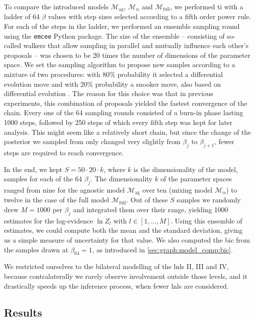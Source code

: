 \documentclass[\relativeRoot/main.tex]{subfiles}
\begin{document}
To compare the introduced models $\mathcal{M}_\text{ag}$, $\mathcal{M}_\alpha$ and $\mathcal{M}_\text{full}$, we performed \gls{ti} with a ladder of 64 $\beta$ values with step sizes selected according to a fifth order power rule. For each of the steps in the ladder, we performed an ensemble sampling round using the \texttt{emcee} \cite{foreman-mackey_emcee_2013} Python package. The size of the ensemble -- consisting of so-called walkers that allow sampling in parallel and mutually influence each other's proposals -- was chosen to be 20 times the number of dimensions of the parameter space. We set the sampling algorithm to propose new samples according to a mixture of two procedures: with 80\% probability it selected a differential evolution move \cite{nelson_run_2013} and with 20\% probability a snooker move, also based on differential evolution \cite{ter_braak_differential_2008}. The reason for this choice was that in previous experiments, this combination of proposals yielded the fastest convergence of the chain. Every one of the 64 sampling rounds consisted of a burn-in phase lasting 1000 steps, followed by 250 steps of which every fifth step was kept for later analysis. This might seem like a relatively short chain, but since the change of the posterior we sampled from only changed very slightly from $\beta_j$ to $\beta_{j+1}$, fewer steps are required to reach convergence.

In the end, we kept $S = 50 \cdot 20 \cdot k$, where $k$ is the dimensionality of the model, samples for each of the 64 $\beta_j$. The dimensionality $k$ of the parameter spaces ranged from nine for the agnostic model $\mathcal{M}_\text{ag}$ over ten (mixing model $\mathcal{M}_\alpha$) to twelve in the case of the full model $\mathcal{M}_\text{full}$. Out of these $S$ samples we randomly drew $M = 1000$ per $\beta_j$ and integrated them over their range, yielding 1000 estimates for the log-evidence $\ln{Z}_l$ with $l \in [1, \ldots, M]$. Using this ensemble of estimates, we could compute both the mean and the standard deviation, giving us a simple measure of uncertainty for that value. We also computed the \gls{bic} from the samples drawn at $\beta_{64} = 1$, as introduced in \cref{sec:graph:model_comp:bic}.

We restricted ourselves to the bilateral modelling of the \glspl{lnl} II, III and IV, because contralaterally we rarely observe involvement outside those levels, and it drastically speeds up the inference process, when fewer \glspl{lnl} are considered.

\subsection{Results}
\label{subsec:bilateral:model_comp:results}
\end{document}
